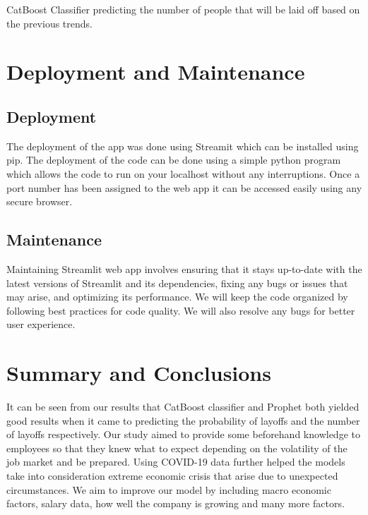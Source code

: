 \documentclass[fleqn,10pt]{SelfArx} %
\begin{document}
CatBoost Classifier predicting the number of people that will be laid off based on the previous trends.

\bigskip
\bigskip

\section{Deployment and Maintenance}

\subsection{Deployment}

The deployment of the app was done using Streamit which can be installed using pip. The deployment of the code can be done using a simple python program which allows the code to run on your localhost without any interruptions. Once a port number has been assigned to the web app it can be accessed easily using any secure browser.

\subsection{Maintenance}

Maintaining Streamlit web app involves ensuring that it stays up-to-date with the latest versions of Streamlit and its dependencies, fixing any bugs or issues that may arise, and optimizing its performance. We will keep the code organized by following best practices for code quality. We will also resolve any bugs for better user experience.

\bigskip
\bigskip

\section{Summary and Conclusions}

It can be seen from our results that CatBoost classifier and Prophet both yielded good results when it came to predicting the probability of layoffs and the number of layoffs respectively. Our study aimed to provide some beforehand knowledge to employees so that they knew what to expect depending on the volatility of the job market and be prepared. Using COVID-19 data further helped the models take into consideration extreme economic crisis that arise due to unexpected circumstances. We aim to improve our model by including macro economic factors, salary data, how well the company is growing and many more factors.
\end{document}
